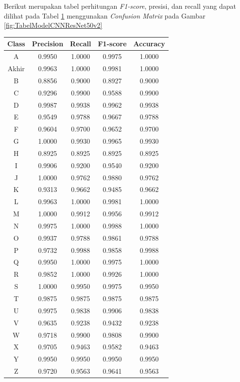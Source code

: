 Berikut merupakan tabel perhitungan \textit{F1-score}, presisi, dan recall yang dapat dilihat pada Tabel \ref{tbl:Tabel Confusion Matrix ResNet50V2} menggunakan \textit{Confusion Matrix} pada Gambar \ref{fig:TabelModelCNNResNet50v2}

\begin{table}[!hbt]
	\centering
	\label{tbl:Tabel Confusion Matrix ResNet50V2}
	\begin{tabular}{|c|c|c|c|c|}
	\hline
	Class & Precision & Recall & F1-score & Accuracy \\
	\hline
	A & 0.9950 & 1.0000 & 0.9975 & 1.0000 \\
	Akhir & 0.9963 & 1.0000 & 0.9981 & 1.0000 \\
	B & 0.8856 & 0.9000 & 0.8927 & 0.9000 \\
	C & 0.9296 & 0.9900 & 0.9588 & 0.9900 \\
	D & 0.9987 & 0.9938 & 0.9962 & 0.9938 \\
	E & 0.9549 & 0.9788 & 0.9667 & 0.9788 \\
	F & 0.9604 & 0.9700 & 0.9652 & 0.9700 \\
	G & 1.0000 & 0.9930 & 0.9965 & 0.9930 \\
	H & 0.8925 & 0.8925 & 0.8925 & 0.8925 \\
	I & 0.9906 & 0.9200 & 0.9540 & 0.9200 \\
	J & 1.0000 & 0.9762 & 0.9880 & 0.9762 \\
	K & 0.9313 & 0.9662 & 0.9485 & 0.9662 \\
	L & 0.9963 & 1.0000 & 0.9981 & 1.0000 \\
	M & 1.0000 & 0.9912 & 0.9956 & 0.9912 \\
	N & 0.9975 & 1.0000 & 0.9988 & 1.0000 \\
	O & 0.9937 & 0.9788 & 0.9861 & 0.9788 \\
	P & 0.9732 & 0.9988 & 0.9858 & 0.9988 \\
	Q & 0.9950 & 1.0000 & 0.9975 & 1.0000 \\
	R & 0.9852 & 1.0000 & 0.9926 & 1.0000 \\
	S & 1.0000 & 0.9950 & 0.9975 & 0.9950 \\
	T & 0.9875 & 0.9875 & 0.9875 & 0.9875 \\
	U & 0.9975 & 0.9838 & 0.9906 & 0.9838 \\
	V & 0.9635 & 0.9238 & 0.9432 & 0.9238 \\
	W & 0.9718 & 0.9900 & 0.9808 & 0.9900 \\
	X & 0.9705 & 0.9463 & 0.9582 & 0.9463 \\
	Y & 0.9950 & 0.9950 & 0.9950 & 0.9950 \\
	Z & 0.9720 & 0.9563 & 0.9641 & 0.9563 \\
	\hline
	\end{tabular}
\end{table}

